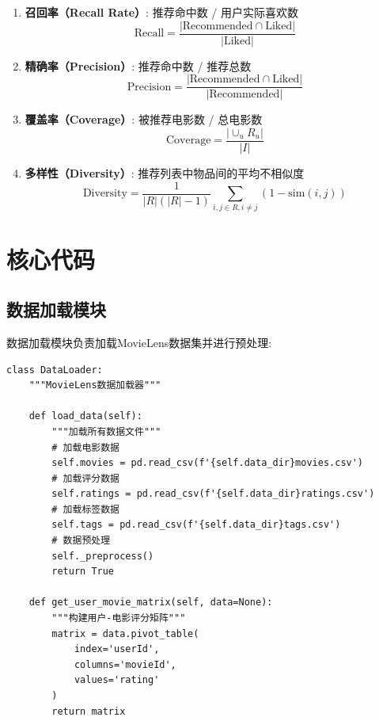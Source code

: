 \documentclass[a4paper]{article}
\begin{document}
\begin{enumerate}
    \item \textbf{召回率（Recall Rate）}: 推荐命中数 / 用户实际喜欢数
    \begin{equation}
    \text{Recall} = \frac{|\text{Recommended} \cap \text{Liked}|}{|\text{Liked}|}
    \end{equation}
    
    \item \textbf{精确率（Precision）}: 推荐命中数 / 推荐总数
    \begin{equation}
    \text{Precision} = \frac{|\text{Recommended} \cap \text{Liked}|}{|\text{Recommended}|}
    \end{equation}
    
    \item \textbf{覆盖率（Coverage）}: 被推荐电影数 / 总电影数
    \begin{equation}
    \text{Coverage} = \frac{|\cup_{u} R_u|}{|I|}
    \end{equation}
    
    \item \textbf{多样性（Diversity）}: 推荐列表中物品间的平均不相似度
    \begin{equation}
    \text{Diversity} = \frac{1}{|R|(|R|-1)} \sum_{i,j \in R, i \neq j} (1 - \text{sim}(i, j))
    \end{equation}
\end{enumerate}

\section{核心代码}

\subsection{数据加载模块}

数据加载模块负责加载MovieLens数据集并进行预处理:

\begin{lstlisting}
class DataLoader:
    """MovieLens数据加载器"""
    
    def load_data(self):
        """加载所有数据文件"""
        # 加载电影数据
        self.movies = pd.read_csv(f'{self.data_dir}movies.csv')
        # 加载评分数据
        self.ratings = pd.read_csv(f'{self.data_dir}ratings.csv')
        # 加载标签数据
        self.tags = pd.read_csv(f'{self.data_dir}tags.csv')
        # 数据预处理
        self._preprocess()
        return True
    
    def get_user_movie_matrix(self, data=None):
        """构建用户-电影评分矩阵"""
        matrix = data.pivot_table(
            index='userId', 
            columns='movieId', 
            values='rating'
        )
        return matrix
\end{lstlisting}
\end{document}
